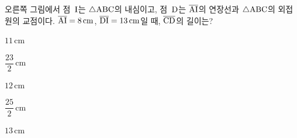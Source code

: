 \noindent\begin{minipage}[t]{0.58\linewidth}\vspace{0pt}\raggedright 오른쪽 그림에서 점~$\mathrm{I}$는 $\triangle\mathrm{ABC}$의 내심이고, 점~$\mathrm{D}$는 $\overline{\mathrm{AI}}$의 연장선과 $\triangle\mathrm{ABC}$의 외접원의 교점이다. $\overline{\mathrm{AI}}=8\,\mathrm{cm}$, $\overline{\mathrm{DI}}=13\,\mathrm{cm}$일 때, $\overline{\mathrm{CD}}$의 길이는?\end{minipage}\hfill\begin{minipage}[t]{0.4\linewidth}\vspace{0pt}\centering \resizebox{\ifdim\width>\linewidth\linewidth\else\width\fi}{!}{}\end{minipage}\par
\begin{choices32}{\rule[-3ex]{0pt}{8ex}$11\,\mathrm{cm}$}{\rule[-3ex]{0pt}{8ex}$\dfrac{23}{2}\,\mathrm{cm}$}{\rule[-3ex]{0pt}{8ex}$12\,\mathrm{cm}$}{\rule[-3ex]{0pt}{8ex}$\dfrac{25}{2}\,\mathrm{cm}$}{\rule[-3ex]{0pt}{8ex}$13\,\mathrm{cm}$}\end{choices32}
